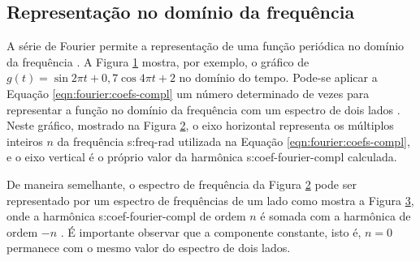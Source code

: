 \documentclass[12pt,oneside,english,brazil,lmodern,siglas,simbolos,cite=num]{ucsmonograph}
\begin{document}
	\subsection{Representação no domínio da frequência} \label{sec:espectros-frequencia}
	A série de Fourier permite a representação de uma função periódica no domínio da frequência \cite{rao:2008}.
	A Figura \ref{fig:funcao-periodica} mostra, por exemplo, o gráfico de $ g(t) = \sin2\pi t + 0,\!7\cos4\pi t + 2 $ no domínio do tempo.
	Pode-se aplicar a Equação \ref{eqn:fourier:coefs-compl} um número determinado de vezes para representar a função no domínio da frequência com um espectro de dois lados \cite{dimarogonas:1995}.
	Neste gráfico, mostrado na Figura \ref{fig:espectro-2sided}, o eixo horizontal representa os múltiplos inteiros $ n $ da frequência \gls{s:freq-rad} utilizada na Equação \ref{eqn:fourier:coefs-compl}, e o eixo vertical é o próprio valor da harmônica \gls{s:coef-fourier-compl} calculada.
	\begin{figure}[ht]
		\label{fig:funcao-periodica}
	\end{figure}

	\begin{figure}[ht]
		\label{fig:espectro-2sided}
	\end{figure}
	
	De maneira semelhante, o espectro de frequência da Figura \ref{fig:espectro-2sided} pode ser representado por um espectro de frequências de um lado como mostra a Figura \ref{fig:espectro-1sided}, onde a harmônica \gls{s:coef-fourier-compl} de ordem $ n $ é somada com a harmônica de ordem $ -n $ \cite{randall:1987}.
	É importante observar que a componente constante, isto é, $ n=0 $ permanece com o mesmo valor do espectro de dois lados.
	\begin{figure}[t]
		\label{fig:espectro-1sided}
	\end{figure}
	
\end{document}
